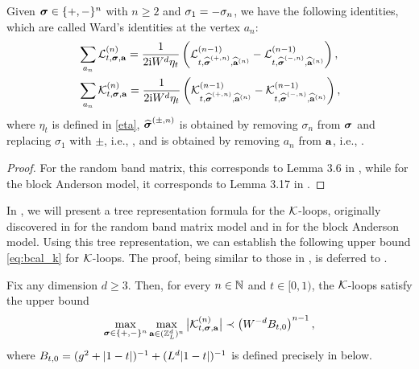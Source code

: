 \begin{lemma}\label{lem_WI_K} 
Given ${\boldsymbol{\sigma}}\in\{+,-\}^n$ with $n\ge 2$ and $\sigma_1=-\sigma_{n}$, we have the following identities, which are called Ward's identities at the vertex $a_n$: 
\begin{align}\label{WI_calL}
&\sum_{a_n}{\mathcal L}^{(n)}_{t, {\boldsymbol{\sigma}}, {\mathbf{a}}}=
\frac{1}{2\mathrm{i} W^d\eta_t}\left( {\mathcal L}^{(n-1)}_{t,  \widehat{{\boldsymbol{\sigma}}}^{(+,n)}, \widehat{{\mathbf{a}}}^{(n)}}- {\mathcal L}^{(n-1)}_{t,  \widehat{{\boldsymbol{\sigma}}}^{(-,n)} , \widehat{{\mathbf{a}}}^{(n)}}\right),  \\
\label{WI_calK}
& \sum_{a_n}{\mathcal K}^{(n)}_{t, {\boldsymbol{\sigma}}, {\mathbf{a}}}=
\frac{1}{2\mathrm{i} W^d\eta_t}\left( {\mathcal K}^{(n-1)}_{t,  \widehat{{\boldsymbol{\sigma}}}^{(+,n)}, \widehat{{\mathbf{a}}}^{(n)}}- {\mathcal K}^{(n-1)}_{t,  \widehat{{\boldsymbol{\sigma}}}^{(-,n)}, \widehat{{\mathbf{a}}}^{(n)}}\right) , 
\end{align}
where $\eta_t$ is defined in \eqref{eta}, $\widehat{{\boldsymbol{\sigma}}}^{(\pm,n)}$ is obtained by removing $\sigma_n$ from ${\boldsymbol{\sigma}}$ and replacing $\sigma_1$ with $\pm$, i.e., , and  is obtained by removing $a_n$ from ${\mathbf{a}}$, i.e., . 
\end{lemma}
\begin{proof}
For the random band matrix, this corresponds to Lemma 3.6 in \cite{YY_25}, while for the block Anderson model, it corresponds to Lemma 3.17 in \cite{RBSO1D}. 
\end{proof}


In , we will present a tree representation formula for the $\mathcal K$-loops, originally discovered in \cite{YY_25} for the random band matrix model and in \cite{RBSO1D} for the block Anderson model. Using this tree representation, we can establish the following upper bound \eqref{eq:bcal_k} for $\mathcal K$-loops. The proof, being similar to those in \cite{YY_25,RBSO1D}, is deferred to .


\begin{lemma}\label{ML:Kbound}
Fix any dimension $d\ge 3$.	Then, for every $n\in \mathbb{N}$ and $t\in [0,1)$, the $\mathcal K$-loops satisfy the upper bound 
	\begin{equation}\label{eq:bcal_k}
		\max_{{\boldsymbol{\sigma}}\in\{+,-\}^n}\max_{{\mathbf{a}}\in({\mathbb Z}_L^d)^n} \big| {\mathcal K}^{(n)}_{t, {\boldsymbol{\sigma}}, {\mathbf{a}}} \big| \prec \left(W^{-d}B_{t,0}\right)^{n-1},      
	\end{equation}
where $B_{t,0}=(g^2+|1-t|)^{-1}+(L^d|1-t|)^{-1}$ is defined precisely in  below. 
\end{lemma}


